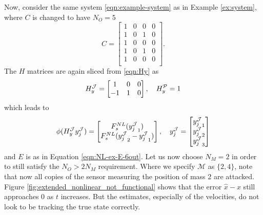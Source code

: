 \begin{example}\label{ex:ext-NL-double-mass}
    Now, consider the same system \eqref{eqn:example-system} as in Example \ref{ex:system}, where $C$ is changed to have $N_O=5$
    \begin{equation*}
        C = 
        \begin{bmatrix}
            1 & 0 & 0 & 0 \\
            1 & 0 & 1 & 0 \\
            1 & 0 & 0 & 0 \\
            1 & 0 & 1 & 0 \\
            1 & 0 & 0 & 0 \\
        \end{bmatrix}.
    \end{equation*}
    The $H$ matrices are again sliced from \eqref{eqn:Hy} as
    \begin{equation*}
        H^{\mathcal{J}}_y =
        \begin{bmatrix}
            1 & 0 & 0 \\
            -1 & 1 & 0 \\
        \end{bmatrix}, \quad
        H^{\mathcal{P}}_y = 1     
    \end{equation*}
    which leads to
    \begin{equation*}
        \phi(H^{\mathcal{J}}_yy^{\mathcal{J}}_j) =
        \begin{bmatrix}
            F^{NL}_s({y^{\mathcal{J}}_j}_1) \\
            F^{NL}_s({y^{\mathcal{J}}_j}_2 - {y^{\mathcal{J}}_j}_1)
        \end{bmatrix}, \quad
        y^{\mathcal{J}}_j=
        \begin{bmatrix}
            {y^{\mathcal{J}}_j}_1 \\ {y^{\mathcal{J}}_j}_2 \\ {y^{\mathcal{J}}_j}_3 \\
        \end{bmatrix}
    \end{equation*}
    and $E$ is as in Equation \eqref{eqn:NL-ex-E-6out}. Let us now choose $N_M=2$ in order to still satisfy the $N_O>2N_M$ requirement. Where we specify $\mathcal{M}$ as $\{2,4\}$, note that now all copies of the sensor measuring the position of mass 2 are attacked. Figure \ref{fig:extended_nonlinear_not_functional} shows that the error $\hat{x}-x$ still approaches $0$ as $t$ increases. But the estimates, especially of the velocities, do not look to be tracking the true state correctly.
    \begin{figure}[H]

\end{figure}
\end{example}
